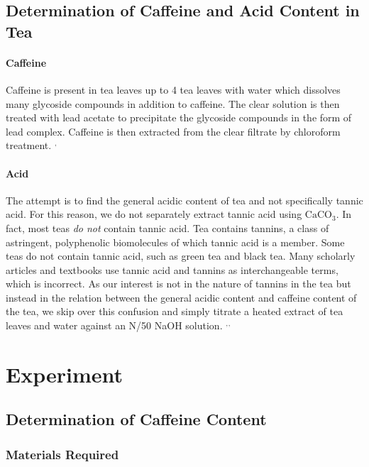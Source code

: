 \documentclass[11pt]{article}
\begin{document}
\subsection{Determination of Caffeine and Acid Content in Tea}
\paragraph {Caffeine} Caffeine is present in tea leaves up to
4%
tea leaves with water which dissolves many
glycoside compounds in addition to
caffeine. The clear solution is then treated
with lead acetate to precipitate the
glycoside compounds in the form of lead
complex. Caffeine is then extracted from the clear filtrate by chloroform treatment. \cite{man}$^,$\cite{man2}

\paragraph{Acid}
The attempt is to find the general acidic content of tea and not specifically tannic acid. For this
reason, we do not separately extract tannic acid using $\mathrm{CaCO_3}$. In fact, most teas \emph{do
  not} contain tannic acid. Tea contains tannins, a class of astringent, polyphenolic
biomolecules of which tannic acid is a member. Some teas do not contain tannic acid, such as green
tea and black tea. Many scholarly articles and textbooks use tannic acid and tannins as
interchangeable terms, which is incorrect. As our interest is not in the nature of tannins in the
tea but instead in the relation between the general acidic content and caffeine content of the tea,
we skip over this confusion and simply titrate a heated extract of tea leaves and water against an
N/50 NaOH solution. \cite{man}$^,$\cite{post}$^,$\cite{Martin1983}


\newpage

\section{Experiment}

\subsection{Determination of Caffeine Content}
\subsubsection{Materials Required}
\end{document}
